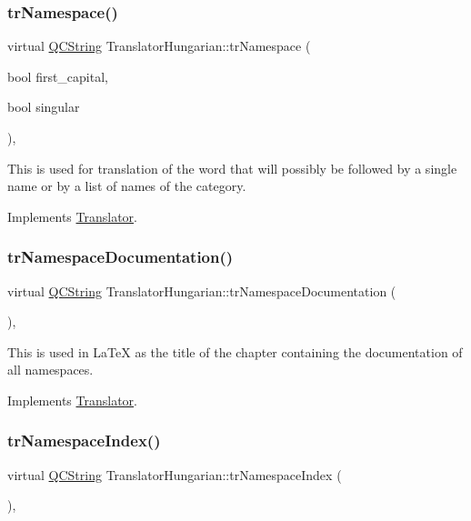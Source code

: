 \subsubsection{\texorpdfstring{trNamespace()}{trNamespace()}}
{\footnotesize\ttfamily virtual \mbox{\hyperlink{class_q_c_string}{Q\+C\+String}} Translator\+Hungarian\+::tr\+Namespace (\begin{DoxyParamCaption}\item[{bool}]{first\+\_\+capital,  }\item[{bool}]{singular }\end{DoxyParamCaption})\hspace{0.3cm}{\ttfamily [inline]}, {\ttfamily [virtual]}}

This is used for translation of the word that will possibly be followed by a single name or by a list of names of the category. 

Implements \mbox{\hyperlink{class_translator}{Translator}}.

\mbox{\label{class_translator_hungarian_a8b89e6caf5650c0fdfda1e3e5b8ad29b}} 
\subsubsection{\texorpdfstring{trNamespaceDocumentation()}{trNamespaceDocumentation()}}
{\footnotesize\ttfamily virtual \mbox{\hyperlink{class_q_c_string}{Q\+C\+String}} Translator\+Hungarian\+::tr\+Namespace\+Documentation (\begin{DoxyParamCaption}{ }\end{DoxyParamCaption})\hspace{0.3cm}{\ttfamily [inline]}, {\ttfamily [virtual]}}

This is used in La\+TeX as the title of the chapter containing the documentation of all namespaces. 

Implements \mbox{\hyperlink{class_translator}{Translator}}.

\mbox{\label{class_translator_hungarian_a3db884a6ab7d0771846b634c1bfc73c1}} 
\subsubsection{\texorpdfstring{trNamespaceIndex()}{trNamespaceIndex()}}
{\footnotesize\ttfamily virtual \mbox{\hyperlink{class_q_c_string}{Q\+C\+String}} Translator\+Hungarian\+::tr\+Namespace\+Index (\begin{DoxyParamCaption}{ }\end{DoxyParamCaption})\hspace{0.3cm}{\ttfamily [inline]}, {\ttfamily [virtual]}}


